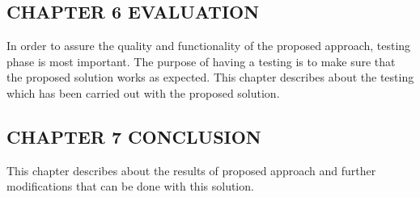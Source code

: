 \subsection{CHAPTER 6 EVALUATION}
In order to assure the quality and functionality of the proposed approach, testing phase is most important. The purpose of having a testing is to make sure that the proposed solution works as expected.
This chapter describes about the testing which has been carried out with the proposed solution.

\subsection{CHAPTER 7 CONCLUSION}
This chapter describes about the results of proposed approach and further modifications that can be done with this solution.

